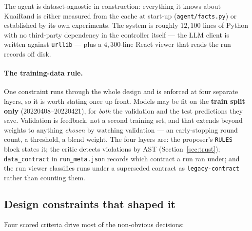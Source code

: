 \documentclass[11pt,a4paper]{article}
\newcommand{\code}[1]{\texttt{#1}}
\newcommand{\file}[1]{\texttt{#1}}
\begin{document}
The agent is dataset-agnostic in construction: everything it knows about KuaiRand is either
measured from the cache at start-up (\file{agent/facts.py}) or established by its own experiments.
The system is roughly $12{,}100$ lines of Python with no third-party dependency in the controller
itself --- the LLM client is written against \code{urllib} --- plus a $4{,}300$-line React viewer
that reads the run records off disk.

\paragraph{The training-data rule.} One constraint runs through the whole design and is enforced
at four separate layers, so it is worth stating once up front. Models may be fit on the
\textbf{train split only} (20220408--20220421), for \emph{both} the validation and the test
predictions they save. Validation is feedback, not a second training set, and that extends beyond
weights to anything \emph{chosen} by watching validation --- an early-stopping round count, a
threshold, a blend weight. The four layers are: the proposer's \code{RULES} block states it; the
critic detects violations by AST (Section~\ref{sec:trust}); \code{data\_contract} in
\file{run\_meta.json} records which contract a run ran under; and the run viewer classifies runs
under a superseded contract as \code{legacy-contract} rather than counting them.

\subsection{Design constraints that shaped it}

Four scored criteria drive most of the non-obvious decisions:
\end{document}
